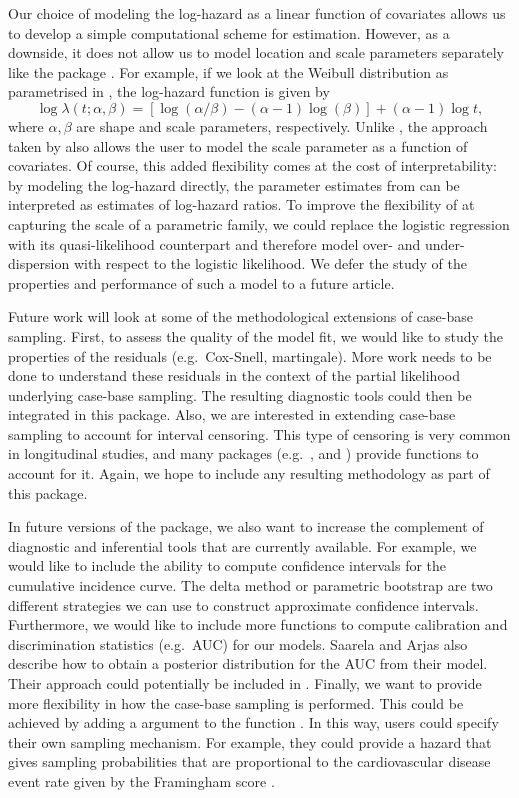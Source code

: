 Our choice of modeling the log-hazard as a linear function of covariates
allows us to develop a simple computational scheme for estimation.
However, as a downside, it does not allow us to model location and scale
parameters separately like the package . For example, if
we look at the Weibull distribution as parametrised in
, the log-hazard function is given by
\[ \log \lambda(t; \alpha, \beta) = \left[\log(\alpha/\beta) - (\alpha - 1)\log(\beta)\right] + (\alpha - 1)\log t,\]
where \(\alpha,\beta\) are shape and scale parameters, respectively.
Unlike , the approach taken by  also allows
the user to model the scale parameter as a function of covariates. Of
course, this added flexibility comes at the cost of interpretability: by
modeling the log-hazard directly, the parameter estimates from
 can be interpreted as estimates of log-hazard ratios. To
improve the flexibility of  at capturing the scale of a
parametric family, we could replace the logistic regression with its
quasi-likelihood counterpart and therefore model over- and
under-dispersion with respect to the logistic likelihood. We defer the
study of the properties and performance of such a model to a future
article.

Future work will look at some of the methodological extensions of
case-base sampling. First, to assess the quality of the model fit, we
would like to study the properties of the residuals (e.g.~Cox-Snell,
martingale). More work needs to be done to understand these residuals in
the context of the partial likelihood underlying case-base sampling. The
resulting diagnostic tools could then be integrated in this package.
Also, we are interested in extending case-base sampling to account for
interval censoring. This type of censoring is very common in
longitudinal studies, and many packages (e.g.~,
 and ) provide functions to account for it.
Again, we hope to include any resulting methodology as part of this
package.

In future versions of the package, we also want to increase the
complement of diagnostic and inferential tools that are currently
available. For example, we would like to include the ability to compute
confidence intervals for the cumulative incidence curve. The delta
method or parametric bootstrap are two different strategies we can use
to construct approximate confidence intervals. Furthermore, we would
like to include more functions to compute calibration and discrimination
statistics (e.g.~AUC) for our models. Saarela and Arjas
\citeyearpar{saarela2015non} also describe how to obtain a posterior
distribution for the AUC from their model. Their approach could
potentially be included in . Finally, we want to provide
more flexibility in how the case-base sampling is performed. This could
be achieved by adding a  argument to the function
. In this way, users could specify their own
sampling mechanism. For example, they could provide a hazard that gives
sampling probabilities that are proportional to the cardiovascular
disease event rate given by the Framingham score \citep{saarela2015non}.

